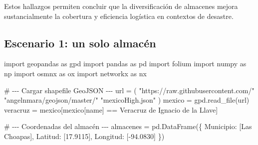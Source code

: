 \documentclass[
  spanish,
  us-letterpaper,
]{scrreprt}
\newenvironment{Shaded}{\begin{snugshade}}{\end{snugshade}}
\newcommand{\CommentTok}[1]{\textcolor[rgb]{0.37,0.37,0.37}{#1}}
\newcommand{\FloatTok}[1]{\textcolor[rgb]{0.68,0.00,0.00}{#1}}
\newcommand{\ImportTok}[1]{\textcolor[rgb]{0.00,0.46,0.62}{#1}}
\newcommand{\NormalTok}[1]{\textcolor[rgb]{0.00,0.23,0.31}{#1}}
\newcommand{\OperatorTok}[1]{\textcolor[rgb]{0.37,0.37,0.37}{#1}}
\newcommand{\StringTok}[1]{\textcolor[rgb]{0.13,0.47,0.30}{#1}}
\numberwithin{equation}{chapter} %
\begin{document}
Estos hallazgos permiten concluir que la diversificación de almacenes
mejora sustancialmente la cobertura y eficiencia logística en contextos
de desastre.

\subsection{Escenario 1: un solo
almacén}\label{escenario-1-un-solo-almacuxe9n}

\begin{Shaded}
\begin{Highlighting}[]
\ImportTok{import}\NormalTok{ geopandas }\ImportTok{as}\NormalTok{ gpd}
\ImportTok{import}\NormalTok{ pandas }\ImportTok{as}\NormalTok{ pd}
\ImportTok{import}\NormalTok{ folium}
\ImportTok{import}\NormalTok{ numpy }\ImportTok{as}\NormalTok{ np}
\ImportTok{import}\NormalTok{ osmnx }\ImportTok{as}\NormalTok{ ox}
\ImportTok{import}\NormalTok{ networkx }\ImportTok{as}\NormalTok{ nx}

\CommentTok{\# {-}{-}{-} Cargar shapefile GeoJSON {-}{-}{-}}
\NormalTok{url }\OperatorTok{=}\NormalTok{ (}
    \StringTok{"https://raw.githubusercontent.com/"}
    \StringTok{"angelnmara/geojson/master/"}
    \StringTok{"mexicoHigh.json"}
\NormalTok{)}
\NormalTok{mexico }\OperatorTok{=}\NormalTok{ gpd.read\_file(url)}
\NormalTok{veracruz }\OperatorTok{=}\NormalTok{ mexico[mexico[}\StringTok{\textquotesingle{}name\textquotesingle{}}\NormalTok{] }\OperatorTok{==} \StringTok{\textquotesingle{}Veracruz de Ignacio de la Llave\textquotesingle{}}\NormalTok{]}

\CommentTok{\# {-}{-}{-} Coordenadas del almacén {-}{-}{-}}
\NormalTok{almacenes }\OperatorTok{=}\NormalTok{ pd.DataFrame(\{}
    \StringTok{\textquotesingle{}Municipio\textquotesingle{}}\NormalTok{: [}\StringTok{\textquotesingle{}Las Choapas\textquotesingle{}}\NormalTok{],}
    \StringTok{\textquotesingle{}Latitud\textquotesingle{}}\NormalTok{: [}\FloatTok{17.9115}\NormalTok{],}
    \StringTok{\textquotesingle{}Longitud\textquotesingle{}}\NormalTok{: [}\OperatorTok{{-}}\FloatTok{94.0830}\NormalTok{]}
\NormalTok{\})}


\end{Highlighting}
\end{Shaded}
\end{document}
